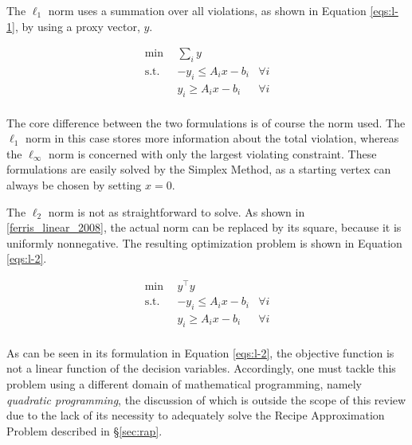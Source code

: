 The $\ell_1$ norm uses a summation over all violations, as shown in
Equation \ref{eqs:l-1}, by using a proxy vector, $y$.

\begin{subequations}\label{eqs:l-1}
  \begin{align}
    \min \:\: & 
    \sum_i y
    & \\
    \text{s.t.} \:\: &
    - y_i \leq A_i x - b_i
    & \forall i \\
    &
    y_i \geq A_i x - b_i
    & \forall i \\
  \end{align}
\end{subequations}

The core difference between the two formulations is of course the norm used. The
$\ell_1$ norm in this case stores more information about the total violation,
whereas the $\ell_\infty$ norm is concerned with only the largest violating
constraint. These formulations are easily solved by the Simplex Method, as a
starting vertex can always be chosen by setting $x = 0$.

The $\ell_2$ norm is not as straightforward to solve. As shown
in \ref{ferris_linear_2008}, the actual norm can be replaced by its square,
because it is uniformly nonnegative. The resulting optimization problem is shown
in Equation \ref{eqs:l-2}.

\begin{subequations}\label{eqs:l-2}
  \begin{align}
    \min \:\: & 
    y^\top y
    & \\
    \text{s.t.} \:\: &
    - y_i \leq A_i x - b_i
    & \forall i \\
    &
    y_i \geq A_i x - b_i
    & \forall i \\
  \end{align}
\end{subequations}

As can be seen in its formulation in Equation \ref{eqs:l-2}, the objective
function is not a linear function of the decision variables. Accordingly, one
must tackle this problem using a different domain of mathematical programming,
namely \textit{quadratic programming}, the discussion of which is outside the
scope of this review due to the lack of its necessity to adequately solve the
Recipe Approximation Problem described in \S\ref{sec:rap}.
